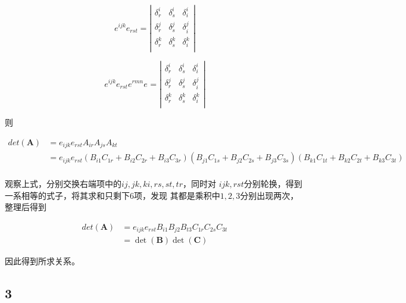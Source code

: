 \documentclass[UTF8,zihao=5]{ctexart}
\begin{document}
\begin{equation*}
    e^{ijk}e_{rst}=\left|
    \begin{matrix}
        \delta^i_r&\delta^i_s&\delta^i_i\\
        \delta^j_r&\delta^j_s&\delta^j_i\\
        \delta^k_r&\delta^k_s&\delta^k_i\\
    \end{matrix}
    \right|
\end{equation*}

\begin{equation*}
    e^{ijk}e_{rst}e^{rmn}e_{}=\left|
    \begin{matrix}
        \delta^i_r&\delta^i_s&\delta^i_i\\
        \delta^j_r&\delta^j_s&\delta^j_i\\
        \delta^k_r&\delta^k_s&\delta^k_i\\
    \end{matrix}
    \right|
\end{equation*}

则


\begin{equation*}
    \begin{split}
        det(\bm{A})&=
        e_{ijk}e_{rst}A_{ir}A_{js}A_{kt}\\
        &=e_{ijk}e_{rst}
        (B_{i1}C_{1r}+B_{i2}C_{2r}+B_{i3}C_{3r})
        (B_{j1}C_{1s}+B_{j2}C_{2s}+B_{j3}C_{3s})
        (B_{k1}C_{1t}+B_{k2}C_{2t}+B_{k3}C_{3t})\\
    \end{split}
\end{equation*}

观察上式，分别交换右端项中的$ij,jk,ki,rs,st,tr$，同时对
$ijk,rst$分别轮换，得到一系相等的式子，将其求和只剩下6项，发现
其都是乘积中$1,2,3$分别出现两次，整理后得到

\begin{equation*}
    \begin{split}
        det(\bm{A})&=
        e_{ijk}e_{rst}B_{i1}B_{j2}B_{t3}C_{1r}C_{2s}C_{3t}\\
        &=\det(\bm{B})\det(\bm{C})
    \end{split}
\end{equation*}

因此得到所求关系。

\subsection*{3}
\end{document}
